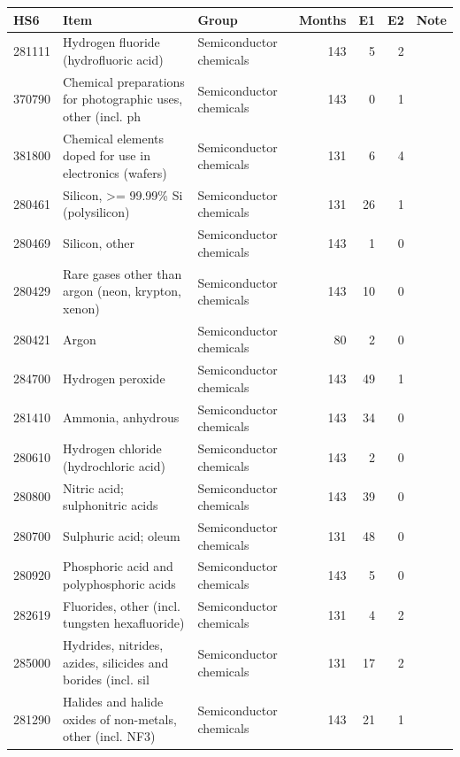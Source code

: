 \noindent\begin{minipage}{\linewidth}
\label{tab:S25_2}
\centering\tiny
\begin{tabular}{llp{3.2cm}rrrl}
\toprule
HS6 & Item & Group & Months & E1 & E2 & Note \\ \midrule
281111 & Hydrogen fluoride (hydrofluoric acid) & Semiconductor chemicals & 143 & 5 & 2 &  \\
370790 & Chemical preparations for photographic uses, other (incl. ph & Semiconductor chemicals & 143 & 0 & 1 &  \\
381800 & Chemical elements doped for use in electronics (wafers) & Semiconductor chemicals & 131 & 6 & 4 &  \\
280461 & Silicon, >= 99.99\% Si (polysilicon) & Semiconductor chemicals & 131 & 26 & 1 &  \\
280469 & Silicon, other & Semiconductor chemicals & 143 & 1 & 0 &  \\
280429 & Rare gases other than argon (neon, krypton, xenon) & Semiconductor chemicals & 143 & 10 & 0 &  \\
280421 & Argon & Semiconductor chemicals & 80 & 2 & 0 &  \\
284700 & Hydrogen peroxide & Semiconductor chemicals & 143 & 49 & 1 &  \\
281410 & Ammonia, anhydrous & Semiconductor chemicals & 143 & 34 & 0 &  \\
280610 & Hydrogen chloride (hydrochloric acid) & Semiconductor chemicals & 143 & 2 & 0 &  \\
280800 & Nitric acid; sulphonitric acids & Semiconductor chemicals & 143 & 39 & 0 &  \\
280700 & Sulphuric acid; oleum & Semiconductor chemicals & 131 & 48 & 0 &  \\
280920 & Phosphoric acid and polyphosphoric acids & Semiconductor chemicals & 143 & 5 & 0 &  \\
282619 & Fluorides, other (incl. tungsten hexafluoride) & Semiconductor chemicals & 131 & 4 & 2 &  \\
285000 & Hydrides, nitrides, azides, silicides and borides (incl. sil & Semiconductor chemicals & 131 & 17 & 2 &  \\
281290 & Halides and halide oxides of non-metals, other (incl. NF3) & Semiconductor chemicals & 143 & 21 & 1 &  \\

\end{tabular}
\end{minipage}
